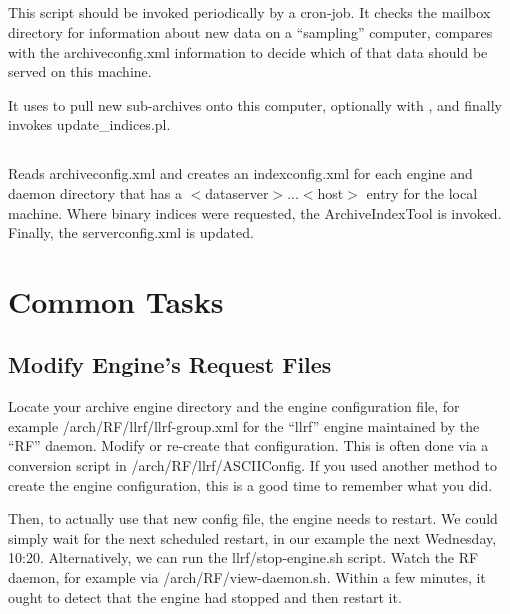 \subsection{} \label{sec:updateServer}
This script should be invoked periodically by a cron-job.
It checks the mailbox directory for information about new data on a
``sampling'' computer, compares with the archiveconfig.xml information
to decide which of that data should be served on this machine.

It uses  to pull new sub-archives onto this computer,
optionally with , and finally invokes update\_indices.pl.

\subsection{} \label{sec:updateIndices}
Reads archiveconfig.xml and creates an indexconfig.xml for each
engine and daemon directory that has a $<$dataserver$>$...$<$host$>$
entry for the local machine.
Where binary indices were requested, the ArchiveIndexTool is invoked.
Finally, the serverconfig.xml is updated.

\section{Common Tasks}
\subsection{Modify Engine's Request Files}
Locate your archive engine directory and the engine configuration
file, for example /arch/RF/llrf/llrf-group.xml for the ``llrf'' engine
maintained by the ``RF'' daemon.  Modify or re-create that
configuration. This is often done via a conversion script in
/arch/RF/llrf/ASCIIConfig. If you used another method to create the
engine configuration, this is a good time to remember what you did.

Then, to actually use that new config file, the engine needs to
restart. We could simply wait for the next scheduled restart, in our
example the next Wednesday, 10:20. Alternatively, we can run the
llrf/stop-engine.sh script.
Watch the RF daemon, for example via /arch/RF/view-daemon.sh.
Within a few minutes, it ought to detect that the engine had stopped
and then restart it.

